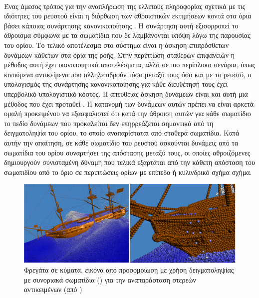\paragraph{} Ένας άμεσος τρόπος για την αναπλήρωση της ελλιπούς πληροφορίας σχετικά με τις
ιδιότητες του ρευστού είναι η διόρθωση των αθροιστικών εκτιμήσεων κοντά στα όρια βάσει
κάποιας συνάρτησης κανονικοποίησης \cite{Feldman2007295}. Η συνάρτηση αυτή εξισορροπεί το
άθροισμα σύμφωνα με τα σωματίδια που δε λαμβάνονται υπόψη λόγω της παρουσίας του ορίου. Το
τελικό αποτέλεσμα στο σύστημα είναι η άσκηση επιπρόσθετων δυνάμεων κάθετων στα όρια της
ροής. Στην περίπτωση σταθερών επιφανειών η μέθοδος αυτή έχει ικανοποιητικά αποτελέσματα,
αλλά σε πιο περίπλοκα σενάρια, όπως κινούμενα αντικείμενα που αλληλεπιδρούν τόσο μεταξύ
τους όσο και με το ρευστό, ο υπολογισμός της συνάρτησης κανονικοποίησης για κάθε
διευθέτησή τους έχει υπερβολικό υπολογιστικό κόστος. Η απευθείας άσκηση δυνάμεων είναι και
αυτή μια μέθοδος που έχει προταθεί \cite{Monaghan20091811}. Η κατανομή των δυνάμεων αυτών
πρέπει να είναι αρκετά ομαλή προκειμένου να εξασφαλιστεί ότι κατά την άθροιση αυτών για
κάθε σωματίδιο το πεδίο δυνάμεων που προκαλείται δεν επηρρεάζεται σημαντικά από τη
δειγματοληψία του ορίου, το οποίο αναπαρίσταται από σταθερά σωματίδια. Κατά αυτήν την
απαίτηση, σε κάθε σωματίδιο του ρευστού ασκούνται δυνάμεις από τα σωματίδια του ορίου
συναρτήσει της απόστασης μεταξύ τους, οι οποίες αθροιζόμενες δημιουργούν συνισταμένη
δύναμη που τελικά εξαρτάται από την κάθετη απόσταση του σωματιδίου από το όριο σε
περιπτώσεις ορίων με επίπεδο ή κυλινδρικό σχήμα σχήμα.

\begin{figure}[h]
  \centering
  \includegraphics[width=\textwidth]{figures/boundary-particles.pdf}
  \caption[Συνοριακά σωματίδια] {Φρεγάτα σε κύματα, εικόνα από προσομοίωση με χρήση
    δειγματοληψίας με συνοριακά σωματίδια () για την αναπαράσταση
    στερεών αντικειμένων (από ) \cite{akinci2012versatile}}
  \label{fig:boundary-particles}
\end{figure}


